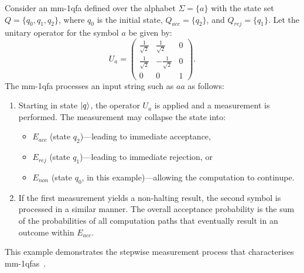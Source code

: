 \begin{example}
    Consider an \gls{mm-1qfa} defined over the alphabet $\Sigma=\{a\}$ with the state set $Q=\{q_0,q_1,q_2\}$, where $q_0$ is the initial state, $Q_{acc}=\{q_2\}$, and $Q_{rej}=\{q_1\}$. Let the unitary operator for the symbol $a$ be given by:
    \[
    U_a = \begin{pmatrix}
    \frac{1}{\sqrt{2}} & \frac{1}{\sqrt{2}} & 0 \\[1mm]
    \frac{1}{\sqrt{2}} & -\frac{1}{\sqrt{2}} & 0 \\[1mm]
    0 & 0 & 1
    \end{pmatrix}.
    \]
    The \gls{mm-1qfa} processes an input string such as $aa$ as follows:
    \begin{enumerate}
        \item Starting in state $\ket{q}$, the operator $U_a$ is applied and a measurement is performed. The measurement may collapse the state into:
        \begin{itemize}
            \item $E_{acc}$ (state $q_2$)—leading to immediate acceptance,
            \item $E_{rej}$ (state $q_1$)—leading to immediate rejection, or
            \item $E_{non}$ (state $q_0$, in this example)—allowing the computation to continupe.
        \end{itemize}
        \item If the first measurement yields a non-halting result, the second symbol is processed in a similar manner. The overall acceptance probability is the sum of the probabilities of all computation paths that eventually result in an outcome within $E_{acc}$.
    \end{enumerate}
    This example demonstrates the stepwise measurement process that characterises \glspl{mm-1qfa}~\cite{kondacs1997power,lin2012another}.
\end{example}